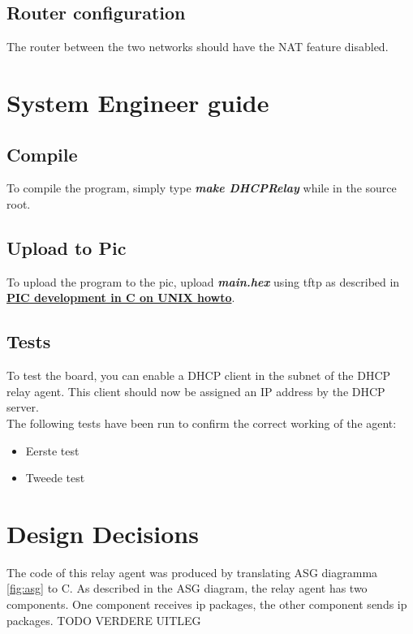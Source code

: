 \documentclass[11pt,a4paper]{scrartcl}
\begin{document}
\subsection{Router configuration}
The router between the two networks should have the NAT feature disabled.

\section{System Engineer guide}
\subsection{Compile}
To compile the program, simply type \textbf{\textit{make DHCPRelay}} while in the source root.

\subsection{Upload to Pic}
To upload the program to the pic, upload \textbf{\textit{main.hex}} using tftp as described in \href{http://www.foditic.org/SORTES\_14/missions/picUnixE.php}{\textbf{PIC development in C on UNIX howto}}.

\subsection{Tests}
To test the board, you can enable a DHCP client in the subnet of the DHCP relay agent. This client should now be assigned an IP address by the DHCP server.\\

The following tests have been run to confirm the correct working of the agent:
\begin{itemize}
\item Eerste test
\item Tweede test
\end{itemize}

\section{Design Decisions}

The code of this relay agent was produced by translating ASG diagramma \ref{fig:asg} to C.
As described in the ASG diagram, the relay agent has two components. One component receives ip packages, the other component sends ip packages. TODO VERDERE UITLEG
\end{document}
